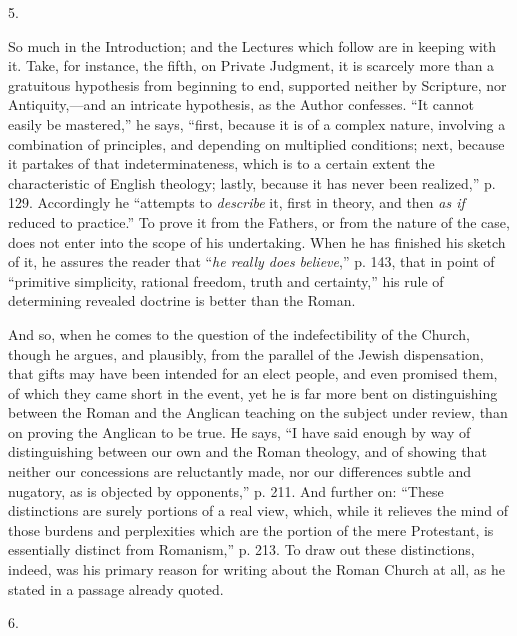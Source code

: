 5.

So much in the Introduction; and the Lectures which follow are in
keeping with it. Take, for instance, the fifth, on Private Judgment,
it is scarcely more than a gratuitous hypothesis from beginning to
end, supported neither by Scripture, nor Antiquity,—and an intricate
hypothesis, as the Author confesses. ``It cannot easily be
mastered,'' he says, ``first, because it is of a complex
nature, involving a combination of principles, and depending on
multiplied conditions; next, because it partakes of that
indeterminateness, which is to a certain extent the characteristic of
English theology; lastly, because it has never been realized,'' p.
129. Accordingly he ``attempts to \emph{describe} it, first
in theory, and then \emph{as if} reduced to practice.'' To prove
it from the Fathers, or from the nature of the case, does not enter
into the scope of his undertaking. When he has finished his sketch of
it, he assures the reader that ``\emph{he really does believe},''
p. 143, that in point of ``primitive simplicity, rational freedom,
truth and certainty,'' his rule of determining revealed doctrine
is better than the Roman.

And so, when he comes to the question of the indefectibility of the
Church, though he argues, and plausibly, from the parallel of the
Jewish dispensation, that gifts may have been intended for an elect
people, and even promised them, of which they came short in the event,
yet he is far more bent on distinguishing between the Roman and the
Anglican teaching on the subject under review, than on proving the
Anglican to be true. He says, ``I have said enough by way of
distinguishing between our own and the Roman theology, and of showing
that neither our concessions are reluctantly made, nor our differences
subtle and nugatory, as is objected by opponents,'' p. 211. And
further on: ``These distinctions are surely portions of a real
view, which, while it relieves the mind of those burdens and
perplexities which are the portion of the mere Protestant, is
essentially distinct from Romanism,'' p. 213. To draw out these
distinctions, indeed, was his primary reason for writing about
the Roman Church at all, as he stated in a passage already quoted.

6.

